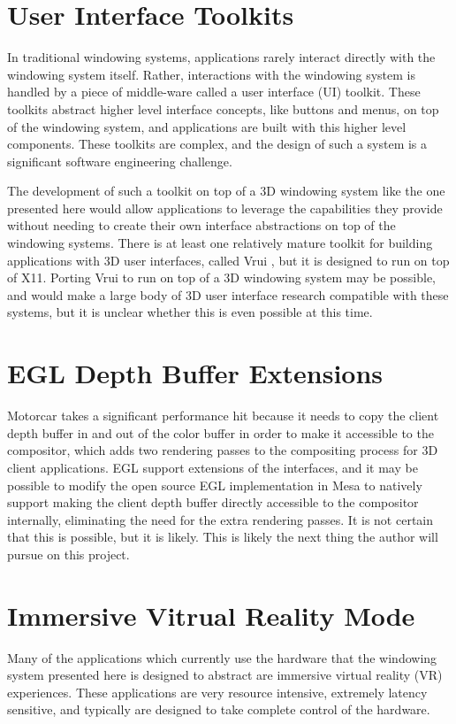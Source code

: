 \section{User Interface Toolkits}

In traditional windowing systems, applications rarely interact directly with the windowing system itself. Rather, interactions with the windowing system is handled by a piece of middle-ware called a user interface (UI) toolkit. These toolkits abstract higher level interface concepts, like buttons and menus, on top of the windowing system, and applications are built with this higher level components. These toolkits are complex, and the design of such a system is a significant software engineering challenge. 

The development of such a toolkit on top of a 3D windowing system like the one presented here  would allow applications to leverage the capabilities they provide without needing to create their own interface abstractions on top of the windowing systems. There is at least one relatively mature toolkit for building applications with 3D user interfaces, called Vrui \cite{vrui}, but it is designed to run on top of X11. Porting Vrui to run on top of a 3D windowing system may be possible, and would make a large body of 3D user interface research compatible with these systems, but it is unclear whether this is even possible at this time.

\section{EGL Depth Buffer Extensions} 
Motorcar takes a significant performance hit because it needs to copy the client depth buffer in and out of the color buffer in order to make it accessible to the compositor, which adds two rendering passes to the compositing process for 3D client applications. EGL support extensions of the interfaces, and it may be possible to modify the open source EGL implementation in Mesa to natively support making the client depth buffer directly accessible to the compositor internally, eliminating the need for the extra rendering passes. It is not certain that this is possible, but it is likely. This is likely the next thing the author will pursue on this project.

\section{Immersive Vitrual Reality Mode}
\label{sec:vr-mode}
Many of the applications which currently use the hardware that the windowing system presented here is designed to abstract are immersive virtual reality (VR) experiences. These applications are very resource intensive, extremely latency sensitive, and typically are designed to take complete control of the hardware.

